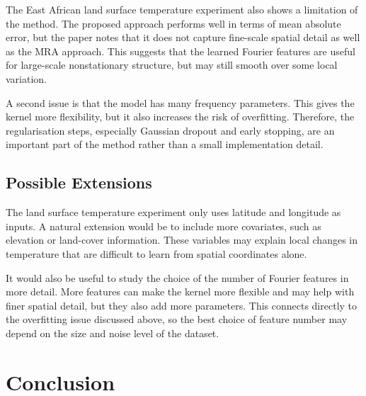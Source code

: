 \documentclass[11pt,a4paper]{article}
\begin{document}
The East African land surface temperature experiment also shows a limitation of
the method. The proposed approach performs well in terms of mean absolute error,
but the paper notes that it does not capture fine-scale spatial detail as well as
the MRA approach. This suggests that the learned Fourier features are useful for
large-scale nonstationary structure, but may still smooth over some local
variation.

A second issue is that the model has many frequency parameters. This gives the
kernel more flexibility, but it also increases the risk of overfitting. Therefore,
the regularisation steps, especially Gaussian dropout and early stopping, are an
important part of the method rather than a small implementation detail.

\subsection{Possible Extensions}

The land surface temperature experiment only uses latitude and longitude as
inputs. A natural extension would be to include more covariates, such as
elevation or land-cover information. These variables may explain local changes in
temperature that are difficult to learn from spatial coordinates alone.

It would also be useful to study the choice of the number of Fourier features in
more detail. More features can make the kernel more flexible and may help with
finer spatial detail, but they also add more parameters. This connects directly
to the overfitting issue discussed above, so the best choice of feature number may
depend on the size and noise level of the dataset.

\section{Conclusion}




\end{document}

